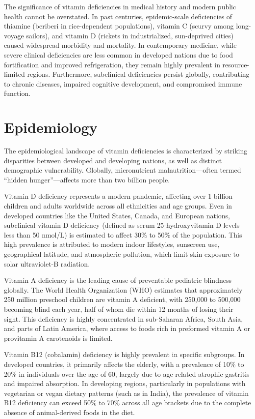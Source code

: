 The significance of vitamin deficiencies in medical history and modern public health cannot be overstated. In past centuries, epidemic-scale deficiencies of thiamine (beriberi in rice-dependent populations), vitamin C (scurvy among long-voyage sailors), and vitamin D (rickets in industrialized, sun-deprived cities) caused widespread morbidity and mortality. In contemporary medicine, while severe clinical deficiencies are less common in developed nations due to food fortification and improved refrigeration, they remain highly prevalent in resource-limited regions. Furthermore, subclinical deficiencies persist globally, contributing to chronic diseases, impaired cognitive development, and compromised immune function.

\section*{Epidemiology}
The epidemiological landscape of vitamin deficiencies is characterized by striking disparities between developed and developing nations, as well as distinct demographic vulnerability. Globally, micronutrient malnutrition---often termed ``hidden hunger''---affects more than two billion people.

Vitamin D deficiency represents a modern pandemic, affecting over 1 billion children and adults worldwide across all ethnicities and age groups. Even in developed countries like the United States, Canada, and European nations, subclinical vitamin D deficiency (defined as serum 25-hydroxyvitamin D levels less than 50 nmol/L) is estimated to affect 30\% to 50\% of the population. This high prevalence is attributed to modern indoor lifestyles, sunscreen use, geographical latitude, and atmospheric pollution, which limit skin exposure to solar ultraviolet-B radiation.

Vitamin A deficiency is the leading cause of preventable pediatric blindness globally. The World Health Organization (WHO) estimates that approximately 250 million preschool children are vitamin A deficient, with 250,000 to 500,000 becoming blind each year, half of whom die within 12 months of losing their sight. This deficiency is highly concentrated in sub-Saharan Africa, South Asia, and parts of Latin America, where access to foods rich in preformed vitamin A or provitamin A carotenoids is limited.

Vitamin B12 (cobalamin) deficiency is highly prevalent in specific subgroups. In developed countries, it primarily affects the elderly, with a prevalence of 10\% to 20\% in individuals over the age of 60, largely due to age-related atrophic gastritis and impaired absorption. In developing regions, particularly in populations with vegetarian or vegan dietary patterns (such as in India), the prevalence of vitamin B12 deficiency can exceed 50\% to 70\% across all age brackets due to the complete absence of animal-derived foods in the diet.

